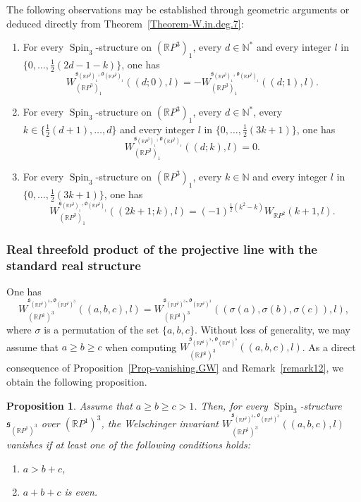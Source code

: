 \documentclass[11pt]{amsart}
\numberwithin{equation}{section}
\theoremstyle{definition}
\theoremstyle{plain}
\newtheorem{proposition}[definition]{Proposition}
\theoremstyle{remark}
\newcommand{\R}{\mathbb{R}}
\DeclareMathOperator{\Spin}{Spin}
\begin{document}
 
The following observations may be established through geometric arguments or deduced directly from Theorem~\ref{Theorem-W.in.deg.7}:
\begin{enumerate}
    \item For every $\Spin_3$-structure on $(\R P^3)_1$, every $d\in \mathbb{N}^*$ and every integer $l$ in $\{0,\ldots, \tfrac{1}{2}(2d-1-k)\}$, one has
    $$W_{(\R P^3)_1}^{\mathfrak{s}_{(\R P^3)_1},\mathfrak{o}_{(\R P^3)_1}}((d;0),l)=-W_{(\R P^3)_1}^{\mathfrak{s}_{(\R P^3)_1},\mathfrak{o}_{(\R P^3)_1}}((d;1),l).$$
    \item  For every $\Spin_3$-structure on $(\R P^3)_1$,  every $d\in \mathbb{N}^*$, every $k\in \{\tfrac{1}{2}(d+1),\ldots,d\}$ and  every integer
$l$ in  $\{0,\ldots, \tfrac{1}{2}(3k+1)\}$, one has
    $$W_{(\R P^3)_1}^{\mathfrak{s}_{(\R P^3)_1},\mathfrak{o}_{(\R P^3)_1}}((d;k),l)=0.$$
    \item  For every $\Spin_3$-structure on $(\R P^3)_1$, every $k\in \mathbb{N}$ and every integer $l$ in  $ \{0,\ldots, \tfrac{1}{2}(3k+1)\}$, one has
    $$W_{(\R P^3)_1}^{\mathfrak{s}_{(\R P^3)_1},\mathfrak{o}_{(\R P^3)_1}}((2k+1;k),l)=(-1)^{\frac{1}{2}(k^2-k)}W_{\R P^2}(k+1,l).$$
\end{enumerate}



\subsubsection{Real threefold product of the projective line with the standard real structure}




One has
$$ W_{(\R P^1)^3}^{\mathfrak{s}_{(\R P^1)^3},\mathfrak{o}_{(\R P^1)^3}}((a,b,c),l)= W_{(\R P^1)^3}^{\mathfrak{s}_{(\R P^1)^3},\mathfrak{o}_{(\R P^1)^3}}((\sigma(a),\sigma(b),\sigma(c)),l),$$ where $\sigma$ is a permutation of the set $\{a,b,c\}$.  Without loss of generality, we may assume that $a \geq b \geq c$ when computing $W_{(\R P^1)^3}^{\mathfrak{s}_{(\R P^1)^3},\mathfrak{o}_{(\R P^1)^3}}((a,b,c),l)$. As a direct consequence of Proposition~\ref{Prop-vanishing.GW} and Remark~\ref{remark12}, we obtain the following proposition.
 
\begin{proposition}\label{Prop-vanishing.W.6.1}
Assume that $a\geq b \geq c >1$. Then, for every $\Spin_3$-structure $\mathfrak{s}_{(\R P^1)^3}$ over $(\R P^1)^3$, the Welschinger invariant
$W_{(\R P^1)^3}^{\mathfrak{s}_{(\R P^1)^3},\mathfrak{o}_{(\R P^1)^3}}((a,b,c),l)$ vanishes if at least one of the following conditions holds:
    \begin{enumerate}
        \item $a> b+c$,
        \item $a+b+c$ is even.
    \end{enumerate}
\end{proposition}
\end{document}
